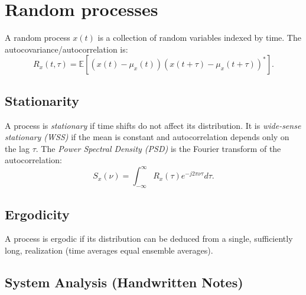 \documentclass[a4paper, 12pt]{book}
\begin{document}
\section{Random processes}
A random process $x(t)$ is a collection of random variables indexed by time. The autocovariance/autocorrelation is:
\begin{equation}
    R_{x}(t,\tau) = \mathbb{E}[(x(t)-\mu_{x}(t))(x(t+\tau)-\mu_{x}(t+\tau))^{*}]. \tag{C.56}
\end{equation}

\subsection{Stationarity}
A process is \textit{stationary} if time shifts do not affect its distribution. It is \textit{wide-sense stationary (WSS)} if the mean is constant and autocorrelation depends only on the lag $\tau$. The \textit{Power Spectral Density (PSD)} is the Fourier transform of the autocorrelation:
\begin{equation}
    S_{x}(\nu) = \int_{-\infty}^{\infty}R_{x}(\tau)e^{-j2\pi\nu\tau}d\tau. \tag{C.57}
\end{equation}

\subsection{Ergodicity}
A process is ergodic if its distribution can be deduced from a single, sufficiently long, realization (time averages equal ensemble averages).

\subsection{System Analysis (Handwritten Notes)}

\begin{center}
\end{center}
\end{document}
